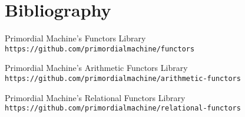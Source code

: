 \chapter{Bibliography}

\nocite{*} %

\begin{thebibliography}{9}
Primordial Machine's Functors Library 
\\\texttt{https://github.com/primordialmachine/functors}

Primordial Machine's Arithmetic Functors Library 
\\\texttt{https://github.com/primordialmachine/arithmetic-functors}

Primordial Machine's Relational Functors Library 
\\\texttt{https://github.com/primordialmachine/relational-functors}

\end{thebibliography}
